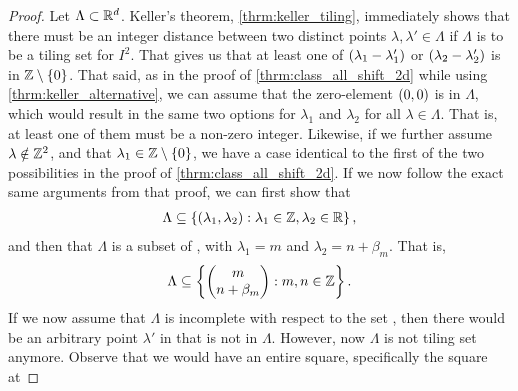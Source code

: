 \documentclass[../thesis.tex]{subfiles}
\begin{document}
\begin{proof}
    Let $\Lambda \subset \mathbb{R}^d$. Keller's theorem, \cref{thrm:keller_tiling}, immediately shows that there must be an integer distance between two distinct points $\lambda,\lambda' \in \Lambda$ if $\Lambda$ is to be a tiling set for $I^2$. That gives us that at least one of $(\lambda_1-\lambda_1')$ or $(\lambda_2-\lambda_2')$ is in $\mathbb{Z}\setminus\{0\}$. That said, as in the proof of \cref{thrm:class_all_shift_2d} while  using \cref{thrm:keller_alternative}, we can assume that the zero-element $(0,0)$ is in $\Lambda$, which would result in the same two options for $\lambda_1$ and $\lambda_2$ for all $\lambda\in \Lambda$. That is, at least one of them must be a non-zero integer. Likewise, if we further assume $\lambda\notin \mathbb{Z}^2$, and that $\lambda_1 \in\mathbb{Z}\setminus\{0\}$, we have a case identical to the first of the two possibilities in the proof of \cref{thrm:class_all_shift_2d}. If we now follow the exact same arguments from that proof, we can first show that 
    \begin{align*}  %
        \Lambda \subseteq \braqMed{ \bracMed{\lambda_1, \lambda_2} : \lambda_1 \in \Z, \lambda_2 \in \R},
    \end{align*}
    and then that $\Lambda$ is a subset of , with $\lambda_1 = m$ and $\lambda_2 = n+\beta_m$. That is,
    \begin{equation*}  %
        \Lambda \subseteq \braqMed{\begin{pmatrix} m \\ n+\beta_m\end{pmatrix} : m,n \in \Z}.
    \end{equation*}
    If we now assume that $\Lambda$ is incomplete with respect to the set , then there would be an arbitrary point $\lambda'$ in  that is not in $\Lambda$. However, now $\Lambda$ is not tiling set anymore. Observe that we would have an entire square, specifically the square at

\end{proof}
\end{document}
